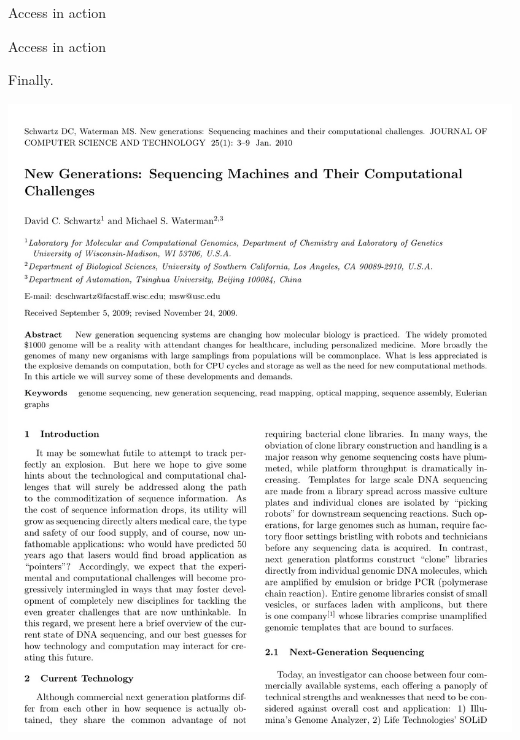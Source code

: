 \documentclass[12pt]{beamer}
\begin{document}
\begin{frame}[t]{Access in action}
\begin{center}
\end{center}

\end{frame}



\begin{frame}[t]{Access in action}

{ \footnotesize \color{subtitle}
Finally.
}

\bigskip
\centerline{
\includegraphics[height=0.75\textheight]{Images/img11.jpg}
}
\end{frame}
\end{document}
